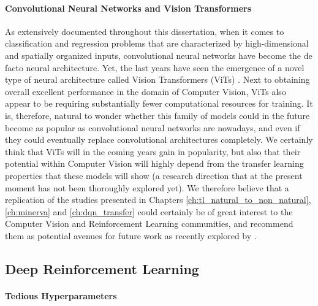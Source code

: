 \paragraph{\textbf{\uppercase{C}onvolutional \uppercase{N}eural \uppercase{N}etworks and \uppercase{V}ision \uppercase{T}ransformers}}
As extensively documented throughout this dissertation, when it comes to classification and regression problems that are characterized by high-dimensional and spatially organized inputs, convolutional neural networks have become the de facto neural architecture. Yet, the last years have seen the emergence of a novel type of neural architecture called Vision Transformers (ViTs) \cite{dosovitskiy2020image}. Next to obtaining overall excellent performance in the domain of Computer Vision, ViTs also appear to be requiring substantially fewer computational resources for training. It is, therefore, natural to wonder whether this family of models could in the future become as popular as convolutional neural networks are nowadays, and even if they could eventually replace convolutional architectures completely. We certainly think that ViTs will in the coming years gain in popularity, but also that their potential within Computer Vision will highly depend from the transfer learning properties that these models will show (a research direction that at the present moment has not been thoroughly explored yet). We therefore believe that a replication of the studies presented in Chapters \ref{ch:tl_natural_to_non_natural}, \ref{ch:minerva} and \ref{ch:dqn_transfer} could certainly be of great interest to the Computer Vision and Reinforcement Learning communities, and recommend them as potential avenues for future work as recently explored by \citet{liu2021efficient}.

\subsection{Deep Reinforcement Learning}
\paragraph{\textbf{\uppercase{T}edious \uppercase{H}yperparameters}}

